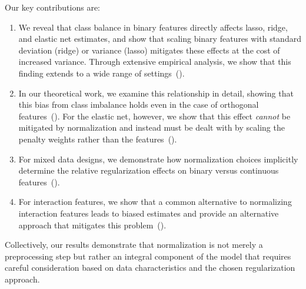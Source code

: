 Our key contributions are:
\begin{enumerate}
  \item We reveal that class balance in binary features directly affects lasso, ridge, and elastic
        net estimates, and show that scaling binary features with standard deviation (ridge) or
        variance (lasso) mitigates these effects at the cost of increased variance. Through
        extensive empirical analysis, we show that this finding extends to a wide range of
        settings~().

  \item In our theoretical work, we examine this relationship in detail, showing that this bias
        from class imbalance holds even in the case of orthogonal
        features~(). For the elastic net, however, we show that
        this effect \emph{cannot} be mitigated by normalization and instead must be dealt with by
        scaling the penalty weights rather than the features~().

  \item For mixed data designs, we demonstrate how normalization choices implicitly determine the
        relative regularization effects on binary versus continuous
        features~().

  \item For interaction features, we show that a common alternative to normalizing interaction
        features leads to biased estimates and provide an alternative approach that mitigates this
        problem~().
\end{enumerate}

Collectively, our results demonstrate that normalization is not merely a preprocessing step
but rather an integral component of the model that requires careful consideration based on
data characteristics and the chosen regularization approach.
